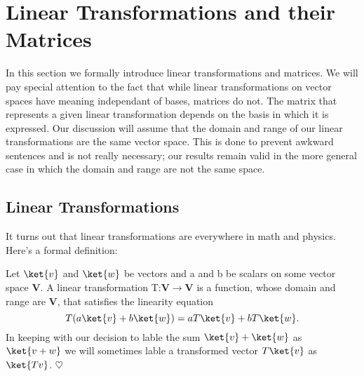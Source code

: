 \section{Linear Transformations and their Matrices}
In this section we formally introduce linear transformations and matrices.  We will pay special attention to the fact that while linear transformations on vector spaces have meaning independant of bases, matrices do not.  The matrix that represents a given linear transformation depends on the basis in which it is expressed.  Our discussion will assume that the domain and range of our linear transformations are the same vector space.  This is done to prevent awkward sentences and is not really necessary; our results remain valid in the more general case in which the domain and range are not the same space.

\subsection{Linear Transformations}
It turns out that linear transformations are everywhere in math and physics. Here's a formal definition:

\begin{definition}
Let $\ket{v}$ and $\ket{w}$ be vectors and a and b be scalars on some vector space \textbf{V}.  A linear transformation T:\textbf{V}$\rightarrow$\textbf{V} is a function, whose domain and range are \textbf{V}, that satisfies the linearity equation
\begin{displaymath}
T(a\ket{v} + b\ket{w}) = aT\ket{v} + bT\ket{w}.
\end{displaymath}
In keeping with our decision to lable the sum $\ket{v} + \ket{w}$ as $\ket{v+w}$ we will sometimes lable a transformed vector $T\ket{v}$ as $\ket{Tv}$. \qquad $\heartsuit$
\end{definition}

